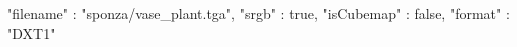 { 
	"filename" : "sponza/vase_plant.tga", 
	"srgb" : true,
	"isCubemap" : false,
	"format" : "DXT1"
}